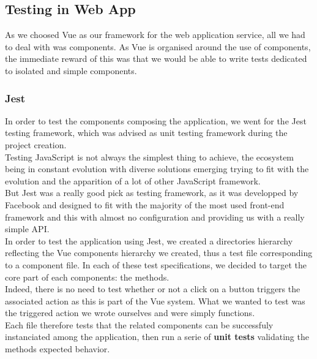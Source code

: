 \documentclass{eplmastersthesis}
\begin{document}
      \subsection{Testing in Web App}

        As we choosed Vue as our framework for the web application service,
        all we had to deal with was components. As Vue is organised around
        the use of components, the immediate reward of this was that we would
        be able to write tests dedicated to isolated and simple components.

        \subsubsection{Jest}

          In order to test the components composing the application, we
          went for the Jest \cite{jest} testing framework, which was advised
          as unit testing framework during the project creation.\\

          Testing JavaScript is not always the simplest thing to achieve, the
          ecosystem being in constant evolution with diverse solutions emerging
          trying to fit with the evolution and the apparition of a lot of
          other JavaScript framework.\\
          But Jest was a really good pick as testing framework, as it was
          developped by Facebook and designed to fit with the majority of the
          most used front-end framework and this with almost no configuration and
          providing us with a really simple API.\\

          In order to test the application using Jest, we created a directories
          hierarchy reflecting the Vue components hierarchy we created, thus
          a test file corresponding to a component file. In each of these
          test specifications, we decided to target the core part of each
          components: the methods.\\
          Indeed, there is no need to test whether or not a click on a button
          triggers the associated action as this is part of the Vue system. What
          we wanted to test was the triggered action we wrote ourselves and
          were simply functions.\\
          Each file therefore tests that the related components can be
          successfuly instanciated among the application, then run a serie
          of \textbf{unit tests} validating the methods expected behavior.
\end{document}
